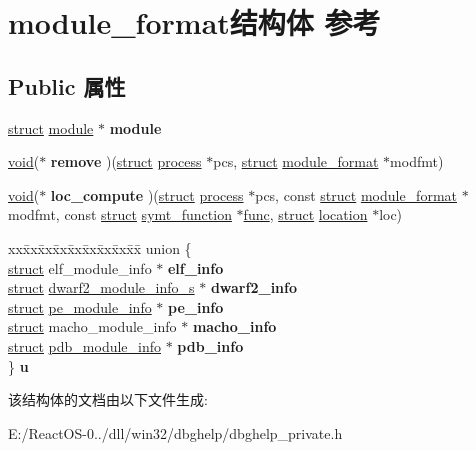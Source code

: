 \hypertarget{structmodule__format}{}\section{module\+\_\+format结构体 参考}
\label{structmodule__format}
\subsection*{Public 属性}
\begin{DoxyCompactItemize}
\item 
\mbox{\label{structmodule__format_a0fbff815fdeb23a7c4db7b0ad7af74d8}} 
\hyperlink{interfacestruct}{struct} \hyperlink{structmodule}{module} $\ast$ {\bfseries module}
\item 
\mbox{\label{structmodule__format_ae9f327a88936a2a3a6c7e4d6bdf0e37f}} 
\hyperlink{interfacevoid}{void}($\ast$ {\bfseries remove} )(\hyperlink{interfacestruct}{struct} \hyperlink{structprocess}{process} $\ast$pcs, \hyperlink{interfacestruct}{struct} \hyperlink{structmodule__format}{module\+\_\+format} $\ast$modfmt)
\item 
\mbox{\label{structmodule__format_a55bfb68fdf37bc5bf6d37790c9781699}} 
\hyperlink{interfacevoid}{void}($\ast$ {\bfseries loc\+\_\+compute} )(\hyperlink{interfacestruct}{struct} \hyperlink{structprocess}{process} $\ast$pcs, const \hyperlink{interfacestruct}{struct} \hyperlink{structmodule__format}{module\+\_\+format} $\ast$modfmt, const \hyperlink{interfacestruct}{struct} \hyperlink{structsymt__function}{symt\+\_\+function} $\ast$\hyperlink{interfacevoid}{func}, \hyperlink{interfacestruct}{struct} \hyperlink{structlocation}{location} $\ast$loc)
\item 
\mbox{\label{structmodule__format_a41598ff7029a8e61f9d7cf72c3d047bd}} 
\begin{tabbing}
xx\=xx\=xx\=xx\=xx\=xx\=xx\=xx\=xx\=\kill
union \{\\
\>\hyperlink{interfacestruct}{struct} elf\_module\_info $\ast$ {\bfseries elf\_info}\\
\>\hyperlink{interfacestruct}{struct} \hyperlink{structdwarf2__module__info__s}{dwarf2\_module\_info\_s} $\ast$ {\bfseries dwarf2\_info}\\
\>\hyperlink{interfacestruct}{struct} \hyperlink{structpe__module__info}{pe\_module\_info} $\ast$ {\bfseries pe\_info}\\
\>\hyperlink{interfacestruct}{struct} macho\_module\_info $\ast$ {\bfseries macho\_info}\\
\>\hyperlink{interfacestruct}{struct} \hyperlink{structpdb__module__info}{pdb\_module\_info} $\ast$ {\bfseries pdb\_info}\\
\} {\bfseries u}\\

\end{tabbing}\end{DoxyCompactItemize}


该结构体的文档由以下文件生成\+:\begin{DoxyCompactItemize}
\item 
E\+:/\+React\+O\+S-\/0../dll/win32/dbghelp/dbghelp\+\_\+private.\+h\end{DoxyCompactItemize}
